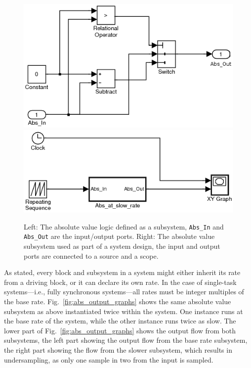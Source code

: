 \begin{figure}
\centering
\includegraphics[scale=0.5]{figs/abs_block_simulink}
\hspace{10mm}
\includegraphics[scale=0.5]{figs/subsystem_simulink}
\caption[Simulink blocks and their compositions.]{Left: The absolute
  value logic defined as a subsystem, \texttt{Abs\_In} and
  \texttt{Abs\_Out} are the input/output ports. Right: The absolute
  value subsystem used as part of a system design, the input and
  output ports are connected to a source and a scope.}
\label{fig:subsystem_simulink}
\end{figure}

As stated, every block and subsystem in a system might either inherit
its rate from a driving block, or it can declare its own rate. In the
case of single-task systems---i.e., fully synchronous systems---all
rates must be integer multiples of the base
rate. Fig.~\ref{fig:abs_output_graphs} shows the same absolute value
subsystem as above instantiated twice within the system. One instance
runs at the base rate of the system, while the other instance runs
twice as slow. The lower part of Fig.~\ref{fig:abs_output_graphs}
shows the output flow from both subsystems, the left part showing the
output flow from the base rate subsystem, the right part showing the
flow from the slower subsystem, which results in undersampling, as
only one sample in two from the input is sampled.

